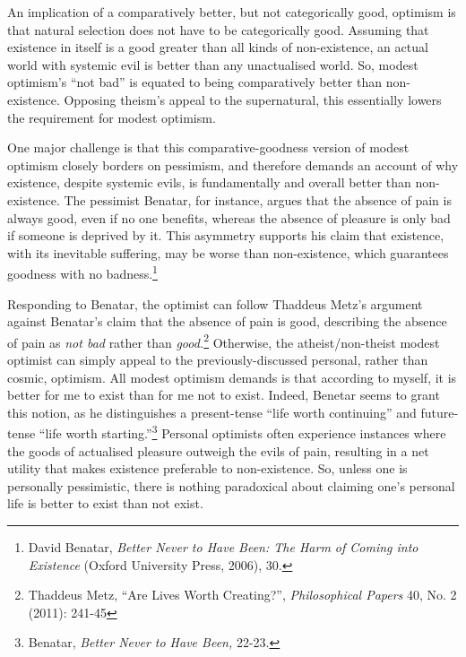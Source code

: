 An implication of a comparatively better, but not categorically good,
optimism is that natural selection does not have to be categorically
good. Assuming that existence in itself is a good greater than all kinds
of non-existence, an actual world with systemic evil is better than any
unactualised world. So, modest optimism's ``not bad'' is equated to
being comparatively better than non-existence. Opposing theism's appeal
to the supernatural, this essentially lowers the requirement for modest
optimism.

One major challenge is that this comparative-goodness version of modest
optimism closely borders on pessimism, and therefore demands an account
of why existence, despite systemic evils, is fundamentally and overall
better than non-existence. The pessimist Benatar, for instance, argues
that the absence of pain is always good, even if no one benefits,
whereas the absence of pleasure is only bad if someone is deprived by
it. This asymmetry supports his claim that existence, with its
inevitable suffering, may be worse than non-existence, which guarantees
goodness with no badness.\footnote{David Benatar, \emph{Better Never to
  Have Been: The Harm of Coming into Existence} (Oxford University
  Press, 2006), 30.}

Responding to Benatar, the optimist can follow Thaddeus Metz's argument
against Benatar's claim that the absence of pain is good, describing the
absence of pain as \emph{not bad} rather than \emph{good.}\footnote{Thaddeus
  Metz, ``Are Lives Worth Creating?'', \emph{Philosophical Papers} 40,
  No. 2 (2011): 241-45} Otherwise, the atheist/non-theist modest
optimist can simply appeal to the previously-discussed personal, rather
than cosmic, optimism. All modest optimism demands is that according to
myself, it is better for me to exist than for me not to exist. Indeed,
Benetar seems to grant this notion, as he distinguishes a present-tense
``life worth continuing'' and future-tense ``life worth
starting.''\footnote{Benatar, \emph{Better Never to Have Been,} 22-23.}
Personal optimists often experience instances where the goods of
actualised pleasure outweigh the evils of pain, resulting in a net
utility that makes existence preferable to non-existence. So, unless one
is personally pessimistic, there is nothing paradoxical about claiming
one's personal life is better to exist than not exist.

